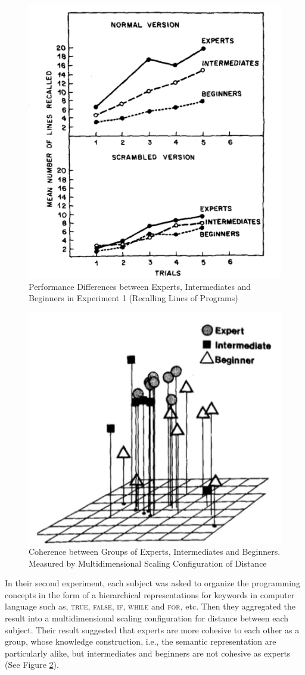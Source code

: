 \begin{figure}
\includegraphics[width = 0.5\columnwidth]{reitmanE1.png}
\centering
\caption{Performance Differences between Experts, Intermediates and Beginners in Experiment 1 (Recalling Lines of Programs) \cite{MCKEITHEN1981307}}
\label{reitmanE1}
\end{figure}

\begin{figure}
\includegraphics[width = 0.5\columnwidth]{reitmanE2.png}
\centering
\caption{Coherence between Groups of Experts, Intermediates and Beginners. Measured by Multidimensional Scaling Configuration of Distance \cite{MCKEITHEN1981307}}
\label{reitmanE2}
\end{figure}

In their second experiment, each subject was asked to organize the programming concepts in the form of a hierarchical representations for keywords in computer language such as, \textsc{true, false}, \textsc{if, while} and \textsc{for}, etc. Then they aggregated the result into a multidimensional scaling configuration for distance between each subject. Their result suggested that experts are more cohesive to each other as a group, whose knowledge construction, i.e., the semantic representation \cite{bobrow1975representation} are particularly alike, but intermediates and beginners are not cohesive as experts (See Figure \ref{reitmanE2}).

